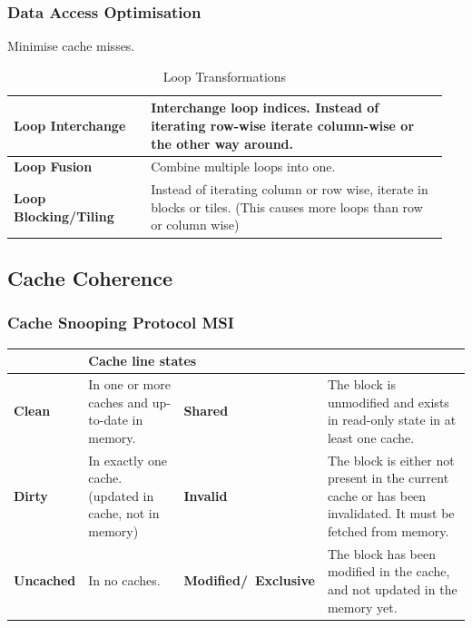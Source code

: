 		\subsubsection{Data Access Optimisation }		
			Minimise cache misses.
			
			\begin{table}[H]
				\centering
				\begin{tabular}{|p{0.3\linewidth}|p{0.65\linewidth}|}
					\hline
					\textbf{Loop Interchange}
						& Interchange loop indices. Instead of iterating row-wise iterate column-wise or the other way around.\\
					\hline
					\textbf{Loop Fusion}
						& Combine multiple loops into one. \\
					\hline
					\textbf{Loop Blocking/Tiling}
						& Instead of iterating column or row wise, iterate in blocks or tiles. (This causes more loops than row or column wise)\\
				\end{tabular}
				\caption{Loop Transformations}
			\end{table}
			
			
	\subsection{Cache Coherence}
		\subsubsection{Cache Snooping Protocol MSI}
			\begin{table}[H]\centering
				\begin{tabular}{|>{\bfseries}p{}|p{}|>{\bfseries}p{}|p{}|}
					\hline
					\multicolumn{2}{|l|}{\textbf{Memory block states}}
						& \multicolumn{2}{|l|}{\textbf{Cache line states}}\\
					\hline
					Clean
						& In one or more caches and up-to-date in memory.
						& Shared
						& The block is unmodified and exists in read-only state in at least one cache.\\
					\hline
					Dirty
						& In exactly one cache. (updated in cache, not in memory)
						& Invalid
						& The block is either not present in the current cache or has been invalidated. It must be fetched from memory.\\
					\hline
					Uncached
						& In no caches.
						& Modified/\newline\ Exclusive
						& The block has been modified in the cache, and not updated in the memory yet.\\
					\hline
				\end{tabular}
			\end{table}
			
